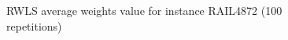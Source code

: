\begin{figure}[H]
	\centering%
	\caption{RWLS average weights value for instance RAIL4872 (100 repetitions)}%
\end{figure}
